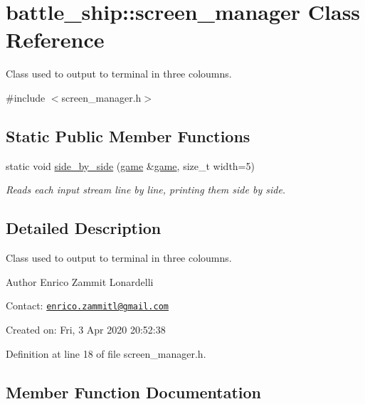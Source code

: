 \hypertarget{classbattle__ship_1_1screen__manager}{}\section{battle\+\_\+ship\+:\+:screen\+\_\+manager Class Reference}
\label{classbattle__ship_1_1screen__manager}


Class used to output to terminal in three coloumns.  




{\ttfamily \#include $<$screen\+\_\+manager.\+h$>$}

\subsection*{Static Public Member Functions}
\begin{DoxyCompactItemize}
\item 
static void \hyperlink{classbattle__ship_1_1screen__manager_abb67a8f394b883d3f36136b40f35c3db}{side\+\_\+by\+\_\+side} (\hyperlink{classbattle__ship_1_1game}{game} \&\hyperlink{classbattle__ship_1_1game}{game}, size\+\_\+t width=5)
\begin{DoxyCompactList}\small\item\em Reads each input stream line by line, printing them side by side. \end{DoxyCompactList}\end{DoxyCompactItemize}


\subsection{Detailed Description}
Class used to output to terminal in three coloumns. 

\begin{DoxyAuthor}{Author}
Enrico Zammit Lonardelli
\end{DoxyAuthor}
Contact\+: \href{mailto:enrico.zammitl@gmail.com}{\tt enrico.\+zammitl@gmail.\+com}

Created on\+: Fri, 3 Apr 2020 20\+:52\+:38 

Definition at line 18 of file screen\+\_\+manager.\+h.



\subsection{Member Function Documentation}
\mbox{\label{classbattle__ship_1_1screen__manager_abb67a8f394b883d3f36136b40f35c3db}} 
